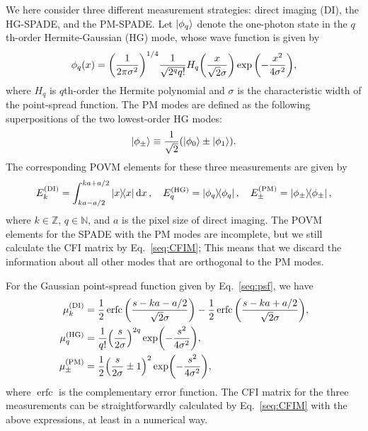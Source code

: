 \documentclass[aps,pra,10pt,showpacs,amsmath,amssymb,floatfix,superscriptaddress,twocolumn]{revtex4-2}
\begin{document}
We here consider three different measurement strategies: direct imaging (DI), the HG-SPADE, and the PM-SPADE.
Let $\ket{\phi_q}$ denote the one-photon state in the \(q\)th-order Hermite-Gaussian (HG) mode, whose wave function is given by
\begin{equation}\label{seq:HG_q}
  \phi_q(x) = \qty(\frac1{2\pi\sigma^2})^{1/4}\frac1{\sqrt{2^qq!}}H_q\qty(\frac x{\sqrt2\sigma})\exp\qty(-\frac{x^2}{4\sigma^2}),
\end{equation}
where $H_q$ is \(q\)th-order the Hermite polynomial and $\sigma$ is the characteristic width of the point-spread function.
The PM modes are defined as the following superpositions of the two lowest-order HG modes:
\begin{equation}\label{seq:PM_pm}
  \ket{\phi_\pm} \equiv \frac1{\sqrt 2} (\ket{\phi_0} \pm \ket{\phi_1}).
\end{equation}
The corresponding POVM elements for these three measurements are given by
\begin{equation}
  E_k^\mathrm{(DI)} = \int_{ka-a/2}^{ka+a/2}\op{x}\dd{x},\quad
  E_q^\mathrm{(HG)} = \op{\phi_q},\quad
  E_\pm^\mathrm{(PM)} = \op{\phi_\pm},
\end{equation}
where $k \in \mathbb{Z}$, $q \in \mathbb{N}$, and \(a\) is the pixel size of direct imaging.
The POVM elements for the SPADE with the PM modes are incomplete, but we still calculate the CFI matrix by Eq.~\eqref{seq:CFIM}; This means that we discard the information about all other modes that are orthogonal to the PM modes.

For the Gaussian point-spread function given by Eq.~\eqref{seq:psf}, we have
\begin{align}
  \mu^\mathrm{(DI)}_k
  &=\frac12 \operatorname{erfc}\qty(\frac{s - k a - a / 2  }{\sqrt2\sigma})
  - \frac12 \operatorname{erfc}\qty(\frac{s - k a + a / 2}{\sqrt2\sigma}),\nonumber \\
  \mu^\mathrm{(HG)}_q
  &= \frac{1}{q!} \qty(\frac{s}{2\sigma})^{2q} \exp(-\frac{s^2}{4\sigma^2}),\nonumber \\
  \mu^\mathrm{(PM)}_\pm
  &= \frac12\qty(\frac{s}{2\sigma} \pm 1)^2\exp(-\frac{s^2}{4\sigma^2}), \label{seq:mu}
\end{align}
where $\operatorname{erfc}$ is the complementary error function.
The CFI matrix for the three measurements can be straightforwardly calculated by Eq.~\eqref{seq:CFIM} with the above expressions, at least in a numerical way.
\end{document}
